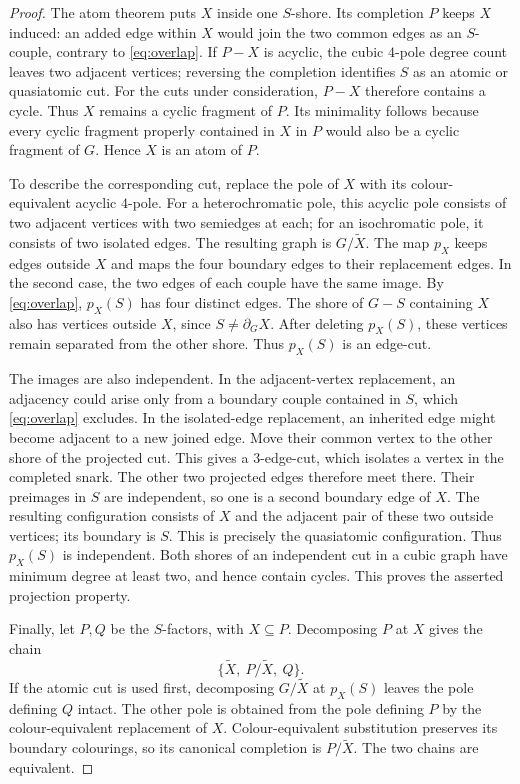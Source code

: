 \documentclass[justified,notoc,twoside,nobib,nofonts]{tufte-handout}
\begin{document}
\begin{proof}
The atom theorem puts $X$ inside one $S$-shore. Its completion $P$
keeps $X$ induced: an added edge within $X$ would join the two common
edges as an $S$-couple, contrary to \eqref{eq:overlap}.
If $P-X$ is acyclic, the cubic $4$-pole degree count leaves two
adjacent vertices; reversing the completion identifies $S$ as an
atomic or quasiatomic cut. For the cuts under consideration,
$P-X$ therefore contains a cycle. Thus $X$ remains a cyclic fragment
of $P$. Its minimality follows because every cyclic fragment
properly contained in $X$ in $P$ would also be a cyclic fragment of
$G$. Hence $X$ is an atom of $P$.

To describe the corresponding cut, replace the pole of $X$ with
its colour-equivalent acyclic $4$-pole. For a heterochromatic pole,
this acyclic pole consists of two adjacent vertices with two
semiedges at each; for an isochromatic pole, it consists of two
isolated edges. The resulting graph is $G/\widetilde X$.
The map $p_X$ keeps edges outside $X$ and maps the four boundary
edges to their replacement edges. In the second case, the two
edges of each couple have the same image.
By \eqref{eq:overlap}, $p_X(S)$ has four distinct edges.
The shore of $G-S$ containing $X$ also has vertices outside $X$,
since $S\ne\partial_G X$. After deleting $p_X(S)$, these vertices
remain separated from the other shore. Thus $p_X(S)$ is an edge-cut.

The images are also independent. In the adjacent-vertex replacement,
an adjacency could arise only from a boundary couple contained in
$S$, which \eqref{eq:overlap} excludes. In the isolated-edge
replacement, an inherited edge might become adjacent to a new
joined edge. Move their common vertex to the other shore of the
projected cut. This gives a $3$-edge-cut, which isolates a vertex in
the completed snark. The other two projected edges therefore meet
there. Their preimages in $S$ are independent, so one is a second
boundary edge of $X$. The resulting configuration consists of $X$
and the adjacent pair of these two outside vertices; its boundary
is $S$. This is precisely the quasiatomic configuration.
Thus $p_X(S)$ is independent. Both shores of an independent cut in
a cubic graph have minimum degree at least two, and hence contain
cycles. This proves the asserted projection property.

Finally, let $P,Q$ be the $S$-factors, with $X\subseteq P$.
Decomposing $P$ at $X$ gives the chain
\[
 \{\widetilde X,\ P/\widetilde X,\ Q\}.
\]
If the atomic cut is used first, decomposing $G/\widetilde X$ at
$p_X(S)$ leaves the pole defining $Q$ intact. The other pole is
obtained from the pole defining $P$ by the colour-equivalent
replacement of $X$. Colour-equivalent substitution preserves its
boundary colourings, so its canonical completion is
$P/\widetilde X$. The two chains are equivalent.
\end{proof}
\end{document}
